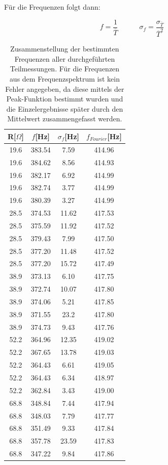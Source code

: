 \documentclass[12pt,a4paper]{article}
\begin{document}
Für die Frequenzen folgt dann:

\begin{equation}
f=\frac{1}{\overline{T}} \quad \quad \quad
\sigma_f=\frac{\sigma_{\overline{T}}}{\overline{T}^2}
\end{equation}


\begin{table}
\caption{Zusammenstellung der bestimmten Frequenzen aller durchgeführten Teilmessungen. Für die Frequenzen aus dem Frequenzspektrum ist kein Fehler angegeben, da diese mittels der Peak-Funktion bestimmt wurden und die Einzelergebnisse später durch den Mittelwert zusammengefasst werden.}
\begin{center}
\begin{tabular}{|c|c|c|c|}
\hline
R[$\Omega$] & $f$[Hz] & $\sigma_{f}$[Hz] & $f_{Fourier}$[Hz]\\
\hline
19.6 & 383.54 & 7.59 & 414.96\\
\hline
19.6 & 384.62 & 8.56 & 414.93\\
\hline
19.6 & 382.17 & 6.92 & 414.99\\
\hline
19.6 & 382.74 & 3.77 & 414.99\\
\hline
19.6 & 380.39 & 3.27 & 414.99\\
\hline
28.5 & 374.53 & 11.62 & 417.53\\
\hline
28.5 & 375.59 & 11.92 & 417.52\\
\hline
28.5 & 379.43 & 7.99 & 417.50\\
\hline
28.5 & 377.20 & 11.48 & 417.52\\
\hline
28.5 & 377.20 & 15.72 & 417.49\\
\hline
38.9 & 373.13 & 6.10 & 417.75\\
\hline
38.9 & 372.74 & 10.07 & 417.80\\
\hline
38.9 & 374.06 & 5.21 & 417.85\\
\hline
38.9 & 371.55 & 23.2 & 417.80\\
\hline
38.9 & 374.73 & 9.43 & 417.76\\
\hline
52.2 & 364.96 & 12.35 & 419.02\\
\hline
52.2 & 367.65 & 13.78 & 419.03\\
\hline
52.2 & 364.43 & 6.61 & 419.05\\
\hline
52.2 & 364.43 & 6.34 & 418.97\\
\hline
52.2 & 362.84 & 3.43 & 419.00\\
\hline
68.8 & 348.84 & 7.44 & 417.94\\
\hline
68.8 & 348.03 & 7.79 & 417.77\\
\hline
68.8 & 351.49 & 9.33 & 417.84\\
\hline
68.8 & 357.78 & 23.59 & 417.83\\
\hline
68.8 & 347.22 & 9.84 & 417.86\\
\hline
\end{tabular}
\end{center}
\label{tab:Ohm}
\end{table}
\end{document}
